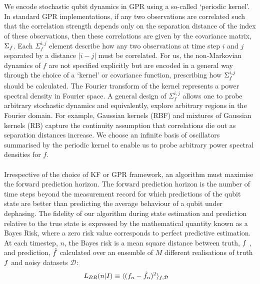 \\
\\
We encode stochastic qubit dynamics in GPR using a so-called `periodic kernel'. In standard GPR implementations, if any two observations are correlated such that the correlation strength depends only on the separation distance of the index of these observations, then these correlations are given by the covariance matrix, $\Sigma_f$. Each $\Sigma_f^{i, j}$ element describe how any two observations at time step $i$ and $j$ separated by a distance $|i-j|$ must be correlated. For us, the non-Markovian dynamics of $f$ are not specified explicitly but are encoded in a general way through the choice of a `kernel' or covariance function, prescribing how $\Sigma_f^{i,j}$ should be calculated. The Fourier transform of the kernel represents a power spectral density in Fourier space. A general design of $\Sigma_f^{i, j}$ allows one to probe arbitrary stochastic dynamics and equivalently, explore arbitrary regions in the Fourier domain. For example, Gaussian kernels (RBF) and mixtures of Gaussian kernels (RB) capture the continuity assumption that correlations die out as separation distances increase. We choose an infinite basis of oscillators summarised by the periodic kernel to enable us to probe arbitrary power spectral densities for $f$.
\\
\\
Irrespective of the choice of KF or GPR framework, an algorithm must maximise the forward prediction horizon. The forward prediction horizon is the number of time steps beyond the measurement record for which predictions of the qubit state are better than predicting the average behaviour of a qubit under dephasing. The fidelity of our algorithm during state estimation and prediction relative to the true state is expressed by the mathematical quantity known as a Bayes Risk, where a zero risk value corresponds to perfect predictive estimation. At each timestep, $n$, the Bayes risk is a mean square distance between truth, $f$ , and prediction, $\hat{f}$ calculated over an ensemble of $M$ different realisations of truth $f$ and noisy datasets $\mathcal{D}$:
\begin{align}
L_{BR}(n | I) & \equiv \langle(f_n - \hat{f}_n)^2 \rangle_{f,\mathcal{D}} \label{eqn:main:sec:ap_opt_LossBR}
\end{align}
